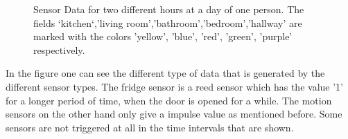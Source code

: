 \begin{figure}[h!]
\begin{minipage}[b]{0.45\textwidth}
   \end{minipage}
   \caption{Sensor Data for two different hours at a day of one person. The fields `kitchen`,'living room','bathroom','bedroom','hallway' are marked with the colors 'yellow', 'blue', 'red', 'green', 'purple' respectively.}
   \label{fig:PlaineSensorData}
 \end{figure}

In the figure one can see the different type of data that is generated by the different sensor types. The fridge sensor is a reed sensor which has the value '1' for a longer period of time, when the door is opened for a while. The motion sensors on the other hand only give a impulse value as mentioned before. Some sensors are not triggered at all in the time intervals that are shown.

